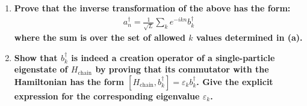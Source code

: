 \documentclass[../../main.tex]{subfiles}
\begin{document}
\begin{enumerate}
  \item \textbf{Prove that the inverse transformation of the above has the form:
  \begin{align*}
    a_{n}^{\dagger} = \frac{1}{\sqrt{L}}\sum_{k}e^{-ikn}b_{k}^{\dagger}
  \end{align*}
  where the sum is over the set of allowed $k$ values determined in (a).}

{}

  \item \textbf{Show that $b^{\dagger}_{k}$ is indeed a creation operator of a single-particle eigenstate of $H_{\text{chain}}$ by proving that its commutator with the Hamiltonian has the form $[H_{\text{chain}}, b^{\dagger}_{k}] = \varepsilon_{k}b^{\dagger}_{k}$. Give the explicit expression for the corresponding eigenvalue $\varepsilon_{k}$.}
  

\end{enumerate}
\end{document}
